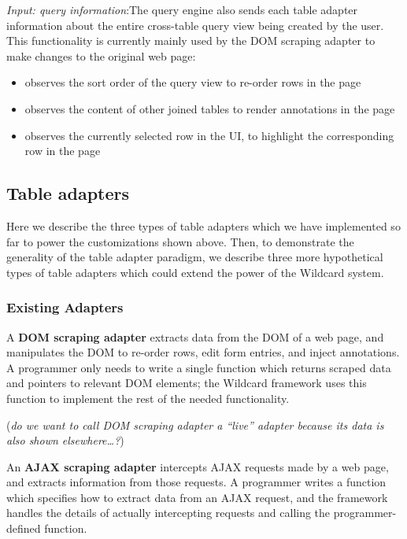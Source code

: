 \documentclass[sigplan,10pt,anonymous,review]{acmart}
\providecommand{\tightlist}{%
  \setlength{\itemsep}{0pt}\setlength{\parskip}{0pt}}
\begin{document}
\emph{Input: query information}:The query engine also sends each table
adapter information about the entire cross-table query view being
created by the user. This functionality is currently mainly used by the
DOM scraping adapter to make changes to the original web page:

\begin{itemize}
\tightlist
\item
  observes the sort order of the query view to re-order rows in the page
\item
  observes the content of other joined tables to render annotations in
  the page
\item
  observes the currently selected row in the UI, to highlight the
  corresponding row in the page
\end{itemize}

\hypertarget{table-adapters}{%
\subsection{Table adapters}\label{table-adapters}}

Here we describe the three types of table adapters which we have
implemented so far to power the customizations shown above. Then, to
demonstrate the generality of the table adapter paradigm, we describe
three more hypothetical types of table adapters which could extend the
power of the Wildcard system.

\hypertarget{existing-adapters}{%
\subsubsection{Existing Adapters}\label{existing-adapters}}

A \textbf{DOM scraping adapter} extracts data from the DOM of a web
page, and manipulates the DOM to re-order rows, edit form entries, and
inject annotations. A programmer only needs to write a single function
which returns scraped data and pointers to relevant DOM elements; the
Wildcard framework uses this function to implement the rest of the
needed functionality.

(\emph{do we want to call DOM scraping adapter a ``live'' adapter
because its data is also shown elsewhere\ldots?})

An \textbf{AJAX scraping adapter} intercepts AJAX requests made by a web
page, and extracts information from those requests. A programmer writes
a function which specifies how to extract data from an AJAX request, and
the framework handles the details of actually intercepting requests and
calling the programmer-defined function.
\end{document}
